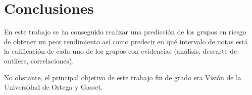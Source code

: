 \chapter{Conclusiones}

En este trabajo se ha conseguido realizar una predicción de los grupos en riesgo de obtener un peor rendimiento así como predecir en qué intervalo de notas está la calificación de cada uno de los grupos con evidencias (análisis, descarte de outliers, correlaciones).

No obstante, el principal objetivo de este trabajo fin de grado era Visión de la Universidad de Ortega y Gasset.